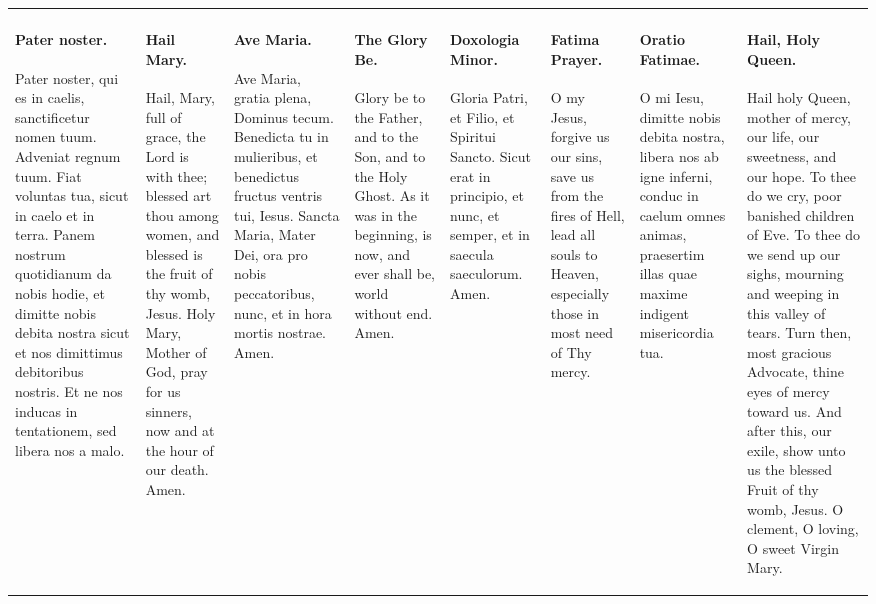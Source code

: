 \documentclass{article}
\begin{document}
\begin{tabularx}{\textwidth}{ |X|X| }
\paragraph{Pater noster.}  Pater noster, qui es in caelis, sanctificetur nomen tuum.
Adveniat regnum tuum. Fiat voluntas tua, sicut in caelo et in terra. Panem nostrum
quotidianum da nobis hodie, et dimitte nobis debita nostra sicut et nos dimittimus
debitoribus nostris. Et ne nos inducas in tentationem, sed libera nos a malo.
&
\paragraph{Hail Mary.} Hail, Mary, full of grace, the Lord is with thee;
blessed art thou among women, and blessed is the fruit of
thy womb, Jesus.  Holy Mary, Mother of God, pray for us sinners,
now and at the hour of our death. Amen.
&
\paragraph{Ave Maria.}Ave Maria, gratia plena, Dominus tecum. Benedicta tu in mulieribus,
et benedictus fructus ventris tui, Iesus. Sancta Maria, Mater Dei, ora pro nobis peccatoribus,
nunc, et in hora mortis nostrae. Amen.
&
\paragraph{The Glory Be.} Glory be to the Father, and to the Son, and to the Holy Ghost. As it was in the beginning, is now, and ever shall be, world without end. Amen.
&
\paragraph{Doxologia Minor.} Gloria Patri, et Filio, et Spiritui Sancto. Sicut erat in principio, et nunc, et semper, et in saecula saeculorum. Amen.
&
\paragraph{Fatima Prayer.} O my Jesus, forgive us our sins, save us from the fires of Hell, lead all souls to Heaven, especially those in most need of Thy mercy.
&
\paragraph{Oratio Fatimae.} O mi Iesu, dimitte nobis debita nostra, libera nos ab igne inferni, conduc in caelum omnes animas, praesertim illas quae maxime indigent misericordia tua.
&
\paragraph{Hail, Holy Queen.} Hail holy Queen, mother of mercy, our life, our sweetness, and our hope. To thee do we cry, poor banished children of Eve. To thee do we send up our sighs, mourning and weeping in this valley of tears. Turn then, most gracious Advocate, thine eyes of mercy toward us. And after this, our exile, show unto us the blessed Fruit of thy womb, Jesus. O clement, O loving, O sweet Virgin Mary.


\end{tabularx}
\end{document}

